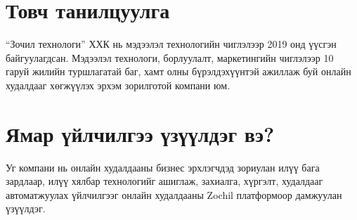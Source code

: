 \section{Товч танилцуулга}
“Зочил технологи” ХХК нь мэдээлэл технологийн чиглэлээр 2019 онд үүсгэн байгуулагдсан. Мэдээлэл технологи, борлуулалт, маркетингийн чиглэлээр 10 гаруй жилийн туршлагатай баг, хамт олны бүрэлдэхүүнтэй ажиллаж буй онлайн худалдааг хөгжүүлэх эрхэм зорилготой компани юм.

\section{Ямар үйлчилгээ үзүүлдэг вэ?}
Уг компани нь онлайн худалдааны бизнес эрхлэгчдэд зориулан илүү бага зардлаар, илүү хялбар технологийг ашиглаж, захиалга, хүргэлт, худалдааг автоматжуулах үйлчилгээг онлайн худалдааны Zochil платформоор дамжуулан үзүүлдэг.
